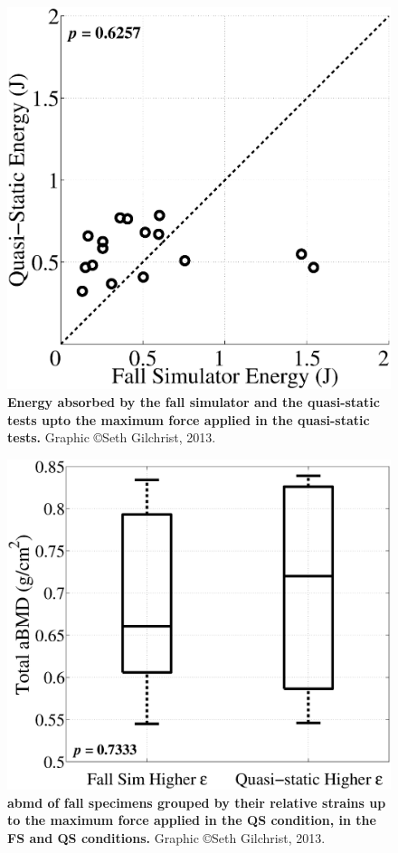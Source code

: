 \begin{figure}[h]
\centering
\includegraphics[width=\linewidth]{./appendixPlots/figures/EnergyVsEnergy}
\caption[Quasi-static vs.\ fall simulator energy]{\textbf{Energy absorbed by the fall simulator and the quasi-static tests upto the maximum force applied in the quasi-static tests.} Graphic \copyright Seth Gilchrist, 2013.}
\label{fig:EnergyVsEnergy}
\end{figure}
\clearpage

\begin{figure}
\centering
\includegraphics[width=\linewidth]{./appendixPlots/figures/DXA_DeltStrain}
\caption[\acs*{abmd} grouped by strain]{\textbf{\ac{abmd} of fall specimens grouped by their relative strains up to the maximum force applied in the QS condition, in the FS and QS conditions.} Graphic \copyright Seth Gilchrist, 2013.}
\label{fig:DXA_DeltStrain}
\end{figure}
\clearpage

